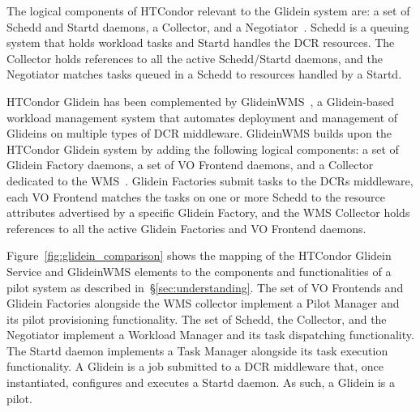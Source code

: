 \documentclass{sig-alternate}
\begin{document}

The logical components of HTCondor relevant to the Glidein system are: a set of
Schedd and Startd daemons, a Collector, and a
Negotiator~\cite{glidein_presentation_url}. Schedd is a queuing system that
holds workload tasks and Startd handles the DCR resources. The Collector holds
references to all the active Schedd/Startd daemons, and the Negotiator matches
tasks queued in a Schedd to resources handled by a Startd.

HTCondor Glidein has been complemented by
GlideinWMS~\cite{sfiligoi2008glideinwms}, a Glidein-based workload management
system that automates deployment and management of Glideins on multiple types of
DCR middleware. GlideinWMS builds upon the HTCondor Glidein system by adding the
following logical components: a set of Glidein Factory daemons, a set of VO
Frontend daemons, and a Collector dedicated to the
WMS~\cite{glideinwms_url,glideinwms_manual_url}. Glidein Factories submit tasks
to the DCRs middleware, each VO Frontend matches the tasks on one or more Schedd
to the resource attributes advertised by a specific Glidein Factory, and the WMS
Collector holds references to all the active Glidein Factories and VO Frontend
daemons.


Figure~\ref{fig:glidein_comparison} shows the mapping of the HTCondor Glidein
Service and GlideinWMS elements to the components and functionalities of a pilot
system as described in~\S\ref{sec:understanding}. The set of VO Frontends and
Glidein Factories alongside the WMS collector implement a Pilot Manager and its
pilot provisioning functionality. The set of Schedd, the Collector, and the
Negotiator implement a Workload Manager and its task dispatching functionality.
The Startd daemon implements a Task Manager alongside its task execution
functionality. A Glidein is a job submitted to a DCR middleware that, once
instantiated, configures and executes a Startd daemon. As such, a Glidein is a
pilot.
\end{document}
